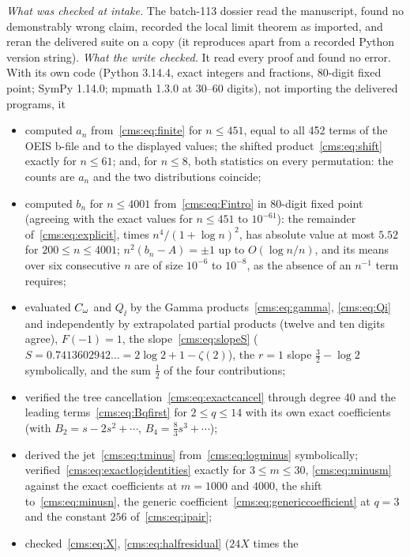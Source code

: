 \begin{writenote}
\emph{What was checked at intake.} The batch-113 dossier read the manuscript,
found no demonstrably wrong claim, recorded the local limit theorem as
imported, and reran the delivered suite on a copy (it reproduces apart from a
recorded Python version string). \emph{What the write checked.} It read every
proof and found no error. With its own code (Python 3.14.4, exact integers and
fractions, 80-digit fixed point; SymPy 1.14.0; mpmath 1.3.0 at 30--60 digits),
not importing the delivered programs, it
\begin{itemize}\raggedright
\item computed $a_n$ from~\eqref{cms:eq:finite} for $n\le451$, equal to all
452 terms of the OEIS b-file and to the displayed values; the shifted
product~\eqref{cms:eq:shift} exactly for $n\le61$; and, for $n\le8$, both
statistics on every permutation: the counts are $a_n$ and the two
distributions coincide;
\item computed $b_n$ for $n\le4001$ from~\eqref{cms:eq:Fintro} in 80-digit
fixed point (agreeing with the exact values for $n\le451$ to $10^{-61}$): the
remainder of~\eqref{cms:eq:explicit}, times $n^4/(1+\log n)^2$, has absolute
value at most $5.52$ for $200\le n\le4001$; $n^2(b_n-A)=\pm1$ up to
$O(\log n/n)$, and its means over six consecutive $n$ are of size $10^{-6}$
to $10^{-8}$, as the absence of an $n^{-1}$ term requires;
\item evaluated $C_\omega$ and $Q_{\ii}$ by the Gamma
products~\eqref{cms:eq:gamma}, \eqref{cms:eq:Qi} and independently by
extrapolated partial products (twelve and ten digits agree), $F(-1)=1$, the
slope~\eqref{cms:eq:slopeS} ($S=0.7413602942\ldots=2\log2+1-\zeta(2)$), the
$r=1$ slope $\frac32-\log2$ symbolically, and the sum $\frac12$ of the four
contributions;
\item verified the tree cancellation~\eqref{cms:eq:exactcancel} through degree
40 and the leading terms~\eqref{cms:eq:Bqfirst} for $2\le q\le14$ with its own
exact coefficients (with $B_2=s-2s^2+\cdots$, $B_4=\frac83s^3+\cdots$);
\item derived the jet~\eqref{cms:eq:tminus} from~\eqref{cms:eq:logminus}
symbolically; verified~\eqref{cms:eq:exactlogidentities} exactly for $3\le
m\le30$, \eqref{cms:eq:minusm} against the exact coefficients at $m=1000$ and
$4000$, the shift to~\eqref{cms:eq:minusn}, the generic
coefficient~\eqref{cms:eq:genericcoefficient} at $q=3$ and the constant
$256$ of~\eqref{cms:eq:ipair};
\item checked~\eqref{cms:eq:X}, \eqref{cms:eq:halfresidual} ($24X$ times the

\end{itemize}
\end{writenote}
